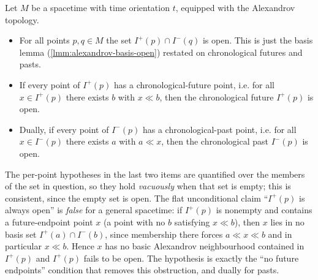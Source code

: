 \begin{lemma}
    \label{lmm:chronological-future-past-open}
    \leanok
    Let $M$ be a spacetime with time orientation $t$, equipped with the Alexandrov topology.
    \begin{itemize}
        \item For all points $p, q \in M$ the set $I^+(p) \cap I^-(q)$ is open. This is just the basis lemma (\ref{lmm:alexandrov-basis-open}) restated on chronological futures and pasts.
        \item If every point of $I^+(p)$ has a chronological-future point, i.e. for all $x \in I^+(p)$ there exists $b$ with $x \ll b$, then the chronological future $I^+(p)$ is open.
        \item Dually, if every point of $I^-(p)$ has a chronological-past point, i.e. for all $x \in I^-(p)$ there exists $a$ with $a \ll x$, then the chronological past $I^-(p)$ is open.
    \end{itemize}

    The per-point hypotheses in the last two items are quantified over the members of the set in question, so they hold \emph{vacuously} when that set is empty; this is consistent, since the empty set is open. The flat unconditional claim ``$I^+(p)$ is always open'' is \emph{false} for a general spacetime: if $I^+(p)$ is nonempty and contains a future-endpoint point $x$ (a point with no $b$ satisfying $x \ll b$), then $x$ lies in no basis set $I^+(a) \cap I^-(b)$, since membership there forces $a \ll x \ll b$ and in particular $x \ll b$. Hence $x$ has no basic Alexandrov neighbourhood contained in $I^+(p)$ and $I^+(p)$ fails to be open. The hypothesis is exactly the ``no future endpoints'' condition that removes this obstruction, and dually for pasts.
\end{lemma}

